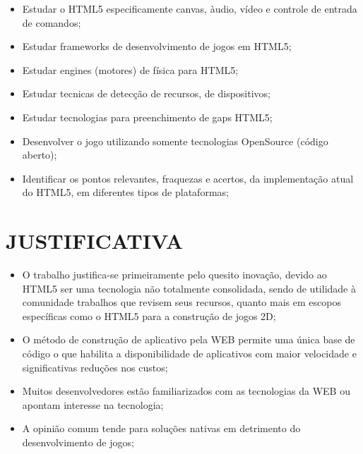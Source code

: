 \documentclass{article}
\begin{document}
\begin{itemize}
    \item Estudar o HTML5 especificamente canvas, àudio, vídeo e controle de entrada de comandos;
    \item Estudar frameworks de desenvolvimento de jogos em HTML5;

    \item Estudar engines (motores) de física para HTML5;

    \item Estudar tecnicas de detecção de recursos, de dispositivos;

    \item Estudar tecnologias para preenchimento de gaps HTML5;

    \item Desenvolver o jogo utilizando somente tecnologias OpenSource (código aberto);

    \item Identificar os pontos relevantes, fraquezas e acertos, da implementação atual do HTML5, em diferentes tipos de plataformas;


\end{itemize}

\section{JUSTIFICATIVA}


\begin{itemize}

    \item O trabalho justifica-se primeiramente pelo quesito inovação, devido ao HTML5 ser uma tecnologia não totalmente consolidada, sendo de utilidade à comunidade trabalhos que revisem seus recursos, quanto mais em escopos específicas como o HTML5 para a construção de jogos 2D;

    \item O método de construção de aplicativo pela WEB permite uma única base de código o que habilita a disponibilidade de aplicativos com maior velocidade e significativas reduções nos custos; 

    \item Muitos desenvolvedores estão familiarizados com as tecnologias da WEB ou apontam interesse na tecnologia;

    \item A opinião comum tende para soluções nativas em detrimento do desenvolvimento de jogos;


\end{itemize}
\end{document}
